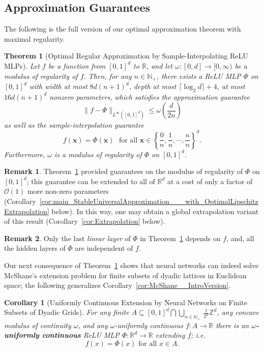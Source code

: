 \documentclass{article}
\numberwithin{equation}{section}
\newtheorem{theorem}{Theorem}[section]
\newtheorem{corollary}{Corollary}[section]
\theoremstyle{definition}
\newtheorem{remark}{Remark}[section]
\begin{document}
\subsection{Approximation Guarantees}
\label{s:Main__ss:Approximation}

The following is the full version of our optimal approximation theorem with maximal regularity.
\begin{theorem}[Optimal Regular Approximation by Sample-Interpolating ReLU MLPs]
\label{thm:MainTheorem_StableUniversalApproximation}
    Let $f$ be a function from $[0,1]^d$ to $\mathbb{R}$, and let $\omega:[0,d]\rightarrow [0,\infty)$ be a modulus of regularity of $f$. Then, for any $n\in\mathbb{N}_+$, there exists a ReLU MLP $\Phi$ on $[0,1]^d$ with width at most $8d(n+1)^d$, depth at most $\lceil \log_2{d} \rceil + 4$, at most $16d(n+1)^d$ nonzero parameters, which satisfies the approximation guarantee 
    \[
        \| f-\Phi \|_{L^{\infty}([0,1]^d)} 
        \le 
        \omega\left(\frac{d}{2n}\right)
    \]
    as well as the sample-interpolation guarantee
    \[
        f(\mathbf{x})=\Phi(\mathbf{x}) 
        \,\,
        \mbox{ for all } \mathbf{x}\in
        \left\{ \frac{0}{n}, \frac{1}{n}, \cdots, \frac{n}{n} \right\}^d
    .
    \]
    Furthermore, $\omega$ is a modulus of regularity of $\Phi$ on $[0,1]^d$.
\end{theorem}
\begin{remark}
Theorem~\ref{thm:MainTheorem_StableUniversalApproximation} provided guarantees on the modulus of regularity of $\Phi$ on $[0,1]^d$; this guarantee can be extended to all of $\mathbb{R}^d$ at a cost of only a factor of $\mathcal{O}(1)$ more non-zero parameters (Corollary~\ref{cor:main_StableUniversalApproximation___with_OptimalLipschitzExtrapolation} below).  In this way, one may obtain a global extrapolation variant of this result (Corollary~\ref{cor:Extrapolation} below).
\end{remark}
\begin{remark}
\label{rem:structure_EncoderDecoder}
Only the last \textit{linear layer} of $\Phi$ in Theorem~\ref{thm:MainTheorem_StableUniversalApproximation} depends on $f$, and, all the hidden layers of $\Phi$ are independent of $f$.
\end{remark}

Our next consequence of Theorem~\ref{thm:MainTheorem_StableUniversalApproximation} shows that neural networks can indeed solve McShane's extension problem for finite subsets of dyadic lattices in Euclidean space; the following generalizes Corollary~\ref{cor:McShane__IntroVersion}.
\begin{corollary}[Uniformly Continuous Extension by Neural Networks on Finite Subsets of Dyadic Grids]
\label{cor:McShane}
For any finite $A\subseteq [0,1]^d\bigcap \bigcup_{n \in \mathbb{N}_+}\, \frac1{2^n} \mathbb{Z}^d$, any concave modulus of continuity $\omega$, and any $\omega$-uniformly continuous $f:A\to \mathbb{R}$ there is an \textbf{$\omega$-uniformly continuous} ReLU MLP $\Phi:\mathbb{R}^d\to \mathbb{R}$ extending $f$; i.e.\
\[
f(x)=\Phi(x) 
\mbox{ for all }x\in A
.
\]
\end{corollary}
\end{document}
